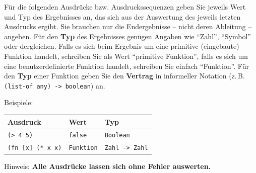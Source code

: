 \documentclass[12pt]{exam}
\begin{document}
\begin{questions}
\pagebreak

\question

Für die folgenden Ausdrücke bzw. Ausdruckssequenzen geben Sie jeweils
Wert und Typ des Ergebnisses an, das sich aus der Auswertung des
jeweils letzten Ausdrucks ergibt. Sie brauchen nur die Endergebnisse
-- nicht deren Ableitung -- angeben. 
Für den \textbf{Typ} des Ergebnisses
genügen Angaben wie "`Zahl"', "`Symbol"' oder dergleichen. Falls es
sich beim Ergebnis um eine primitive (eingebaute) Funktion handelt,
schreiben Sie als Wert "`primitive Funktion"', falls es sich um eine
benutzerdefinierte Funktion handelt, schreiben Sie einfach
"`Funktion"'. Für den \textbf{Typ} einer Funktion geben Sie den
\textbf{Vertrag} in informeller Notation (z.\,B. \texttt{(list-of any)
  -> boolean}) an.

Beispiele: 

  \begin{tabular}{|l|l|l|}
  	\hline
    \textbf{Ausdruck}&\textbf{Wert}&\textbf{Typ}\\
    \hline
    \texttt{(> 4 5)}&\texttt{false}&\texttt{Boolean}\\
    \hline
    \texttt{(fn [x] (* x x)}&\texttt{Funktion}&\texttt{Zahl -> Zahl}\\
    \hline
  \end{tabular}

Hinweis: \textbf{Alle Ausdrücke lassen sich ohne Fehler auswerten.}


\end{questions}
\end{document}
